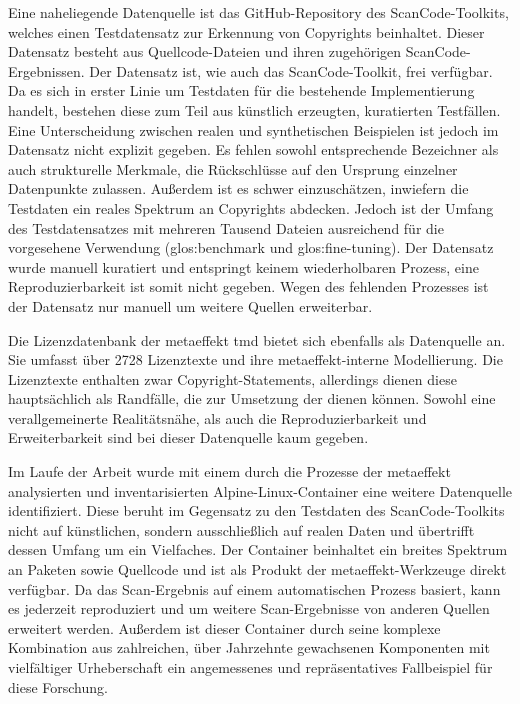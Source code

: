 Eine naheliegende Datenquelle ist das GitHub-Repository des ScanCode-Toolkits, welches einen Testdatensatz zur Erkennung von Copyrights beinhaltet.
Dieser Datensatz besteht aus Quellcode-Dateien und ihren zugehörigen ScanCode-Ergebnissen.
Der Datensatz ist, wie auch das ScanCode-Toolkit, frei verfügbar.
Da es sich in erster Linie um Testdaten für die bestehende Implementierung handelt, bestehen diese zum Teil aus künstlich erzeugten, kuratierten Testfällen.
Eine Unterscheidung zwischen realen und synthetischen Beispielen ist jedoch im Datensatz nicht explizit gegeben.
Es fehlen sowohl entsprechende Bezeichner als auch strukturelle Merkmale, die Rückschlüsse auf den Ursprung einzelner Datenpunkte zulassen.
Außerdem ist es schwer einzuschätzen, inwiefern die Testdaten ein reales Spektrum an Copyrights abdecken.
Jedoch ist der Umfang des Testdatensatzes mit mehreren Tausend Dateien ausreichend für die vorgesehene Verwendung (\gls{glos:benchmark} und \gls{glos:fine-tuning}).
Der Datensatz wurde manuell kuratiert und entspringt keinem wiederholbaren Prozess, eine Reproduzierbarkeit ist somit nicht gegeben.
Wegen des fehlenden Prozesses ist der Datensatz nur manuell um weitere Quellen erweiterbar.

Die Lizenzdatenbank der metaeffekt \gls{tmd} bietet sich ebenfalls als Datenquelle an.
Sie umfasst über \num{2728} Lizenztexte und ihre metaeffekt-interne Modellierung.
Die Lizenztexte enthalten zwar Copyright-Statements, allerdings dienen diese hauptsächlich als Randfälle, die zur Umsetzung der  dienen können.
Sowohl eine verallgemeinerte Realitätsnähe, als auch die Reproduzierbarkeit und Erweiterbarkeit sind bei dieser Datenquelle kaum gegeben.

Im Laufe der Arbeit wurde mit einem durch die Prozesse der metaeffekt analysierten und inventarisierten Alpine-Linux-Container eine weitere Datenquelle identifiziert.
Diese beruht im Gegensatz zu den Testdaten des ScanCode-Toolkits nicht auf künstlichen, sondern ausschließlich auf realen Daten und übertrifft dessen Umfang um ein Vielfaches.
Der Container beinhaltet ein breites Spektrum an Paketen sowie Quellcode und ist als Produkt der metaeffekt-Werkzeuge direkt verfügbar.
Da das Scan-Ergebnis auf einem automatischen Prozess basiert, kann es jederzeit reproduziert und um weitere Scan-Ergebnisse von anderen Quellen erweitert werden.
Außerdem ist dieser Container durch seine komplexe Kombination aus zahlreichen, über Jahrzehnte gewachsenen Komponenten mit vielfältiger Urheberschaft ein angemessenes und repräsentatives Fallbeispiel für diese Forschung.

